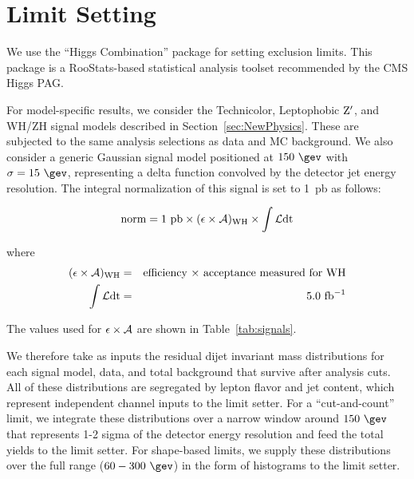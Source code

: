 \section{Limit Setting}
\label{sec:limits}
We use the ``Higgs Combination'' package \cite{cite:combine} for
setting exclusion limits. This package is a
RooStats\cite{cite:roostats}-based statistical analysis toolset
recommended by the CMS Higgs PAG.

For model-specific results, we consider the Technicolor, Leptophobic
$\mathrm{Z}^\prime$, and WH/ZH signal models described in
Section~\ref{sec:NewPhysics}. These are subjected to the same analysis
selections as data and MC background. We also consider a generic Gaussian
signal model positioned at $150~\gev$ with $\sigma=15~\gev$,
representing a delta function convolved by the detector jet energy
resolution. The integral normalization of this signal is set to 1~pb as follows:

\begin{equation*}
  \textrm{norm} =  1~\textrm{pb} \times (\epsilon\times\cal{A})_{\textrm{WH}} \times \int \cal{L} \textrm{dt}
\end{equation*}

where
\begin{eqnarray*}
  (\epsilon\times\cal{A})_{\textrm{WH}} &=& \textrm{efficiency $\times$ acceptance measured for WH} \\
     \int \cal{L} \textrm{dt} &=& 5.0~\textrm{fb}^{-1}
\end{eqnarray*}

The values used for $\epsilon\times\cal{A}$ are shown in Table~\ref{tab:signals}.

We therefore take as inputs the residual dijet invariant mass
distributions for each signal model, data, and total background that
survive after analysis cuts. All of these distributions are segregated by lepton flavor and jet content, which represent independent
channel inputs to the limit setter. For a ``cut-and-count'' limit, we
integrate these distributions over a narrow window around $150~\gev$
that represents 1-2 sigma of the detector energy resolution and feed the
total yields to the limit setter. For shape-based limits, we supply
these distributions over the full range ($60-300~\gev$) in the form of
histograms to the limit setter.



